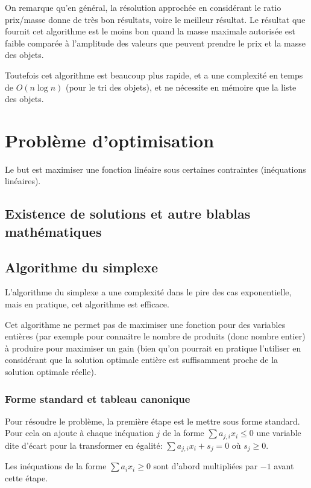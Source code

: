 \documentclass{scrartcl}
\begin{document}
    On remarque qu'en général, la résolution approchée en considérant le ratio
    \nobreak prix/masse donne de très bon résultats, voire le meilleur
    résultat. Le résultat que fournit cet algorithme est le moins bon quand la
    masse maximale autorisée est faible comparée à l'amplitude des valeurs que
    peuvent prendre le prix et la masse des objets.
    
    Toutefois cet algorithme est beaucoup plus rapide, et a une complexité en
    temps de $O(n \log n)$ (pour le tri des objets), et ne nécessite en mémoire
    que la liste des objets.

\section{Problème d'optimisation} %
  Le but est maximiser une fonction linéaire sous certaines contraintes
  (inéquations linéaires).

  \subsection{Existence de solutions et autre blablas mathématiques}

  \subsection{Algorithme du simplexe}
    L'algorithme du simplexe a une complexité dans le pire des cas
    exponentielle, mais en pratique, cet algorithme est efficace.
    
    Cet algorithme ne permet pas de maximiser une fonction pour des variables
    entières (par exemple pour connaitre le nombre de produits (donc nombre
    entier) à produire pour maximiser un gain (bien qu'on pourrait en pratique
    l'utiliser en considérant que la solution optimale entière est suffisamment
    proche de la solution optimale réelle).

    \subsubsection{Forme standard et tableau canonique}
      Pour résoudre le problème, la première étape est le mettre sous forme
      standard. Pour cela on ajoute à chaque inéquation $j$ de la forme
      $\sum a_{j,i}x_i \leq 0$ une variable dite d'écart pour la transformer en
      égalité: $\sum a_{j,i}x_i + s_j = 0$ où $s_j \geq 0$.
      
      Les inéquations de la forme $\sum a_ix_i \geq 0$ sont d'abord multipliées
      par $-1$ avant cette étape.
\end{document}
